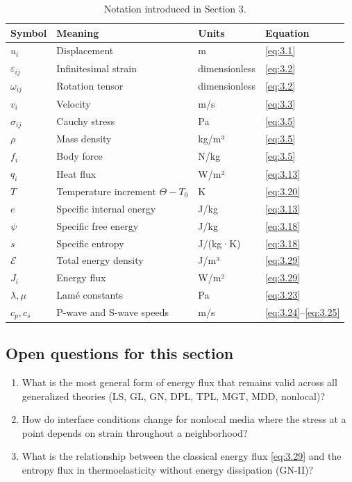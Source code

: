 \begin{table}[htbp]
\centering
\small
\caption{Notation introduced in Section 3.}
\label{tab:notation-sec3}
\begin{tabularx}{\textwidth}{@{}p{1.8cm}X p{2.2cm}p{2.1cm}@{}}
\toprule
\textbf{Symbol} & \textbf{Meaning} & \textbf{Units} & \textbf{Equation} \\
\midrule
$u_i$ & Displacement & m & \eqref{eq:3.1} \\
$\varepsilon_{ij}$ & Infinitesimal strain & dimensionless & \eqref{eq:3.2} \\
$\omega_{ij}$ & Rotation tensor & dimensionless & \eqref{eq:3.2} \\
$v_i$ & Velocity & m/s & \eqref{eq:3.3} \\
$\sigma_{ij}$ & Cauchy stress & Pa & \eqref{eq:3.5} \\
$\rho$ & Mass density & kg/m³ & \eqref{eq:3.5} \\
$f_i$ & Body force & N/kg & \eqref{eq:3.5} \\
$q_i$ & Heat flux & W/m² & \eqref{eq:3.13} \\
$T$ & Temperature increment $\Theta-T_0$ & K & \eqref{eq:3.20} \\
$e$ & Specific internal energy & J/kg & \eqref{eq:3.13} \\
$\psi$ & Specific free energy & J/kg & \eqref{eq:3.18} \\
$s$ & Specific entropy & J/(kg·K) & \eqref{eq:3.18} \\
$\mathcal{E}$ & Total energy density & J/m³ & \eqref{eq:3.29} \\
$J_i$ & Energy flux & W/m² & \eqref{eq:3.29} \\
$\lambda, \mu$ & Lamé constants & Pa & \eqref{eq:3.23} \\
$c_p, c_s$ & P-wave and S-wave speeds & m/s & \eqref{eq:3.24}--\eqref{eq:3.25} \\
\bottomrule
\end{tabularx}
\end{table}

\subsection{Open questions for this section}

\begin{enumerate}[label=\textbf{OQ3.\arabic*}]
\item What is the most general form of energy flux that remains valid across all generalized theories (LS, GL, GN, DPL, TPL, MGT, MDD, nonlocal)? \label{oq:3.1}
\item How do interface conditions change for nonlocal media where the stress at a point depends on strain throughout a neighborhood? \label{oq:3.2}
\item What is the relationship between the classical energy flux \cite{Biot1956} \eqref{eq:3.29} and the entropy flux in thermoelasticity without energy dissipation (GN-II)? \label{oq:3.3}
\end{enumerate}

